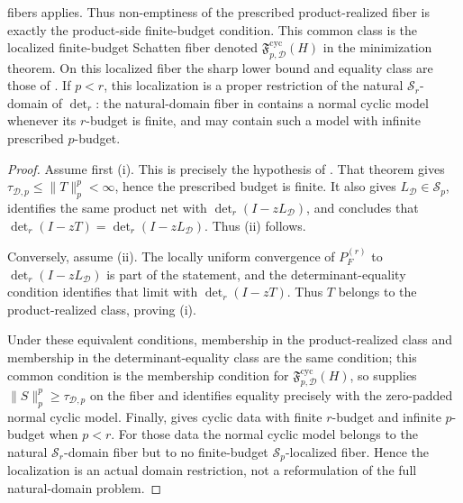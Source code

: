 \begin{proposition}
  fibers applies.  Thus non-emptiness of the prescribed product-realized fiber
  is exactly the product-side finite-budget condition.
  This common class is the localized finite-budget Schatten fiber denoted
  \(\mathfrak F_{p,\mathcal D}^{\mathrm{cyc}}(H)\) in the minimization theorem.
  On this localized fiber the sharp lower bound and equality class are those of
  .  If \(p<r\), this
  localization is a proper restriction of the natural \(\mathcal S_r\)-domain
  of \(\det_r\): the natural-domain fiber in
   contains a normal cyclic
  model whenever its \(r\)-budget is finite, and may contain such a model with
  infinite prescribed \(p\)-budget.
\end{proposition}

\begin{proof}
  Assume first \textup{(i)}.  This is precisely the hypothesis of
  .  That theorem gives
  \(\tau_{\mathcal D,p}\le\|T\|_p^p<\infty\), hence the prescribed budget is
  finite.  It also gives \(L_{\mathcal D}\in\mathcal S_p\), identifies the same
  product net with \(\det_r(I-zL_{\mathcal D})\), and concludes that
  \(\det_r(I-zT)=\det_r(I-zL_{\mathcal D})\).  Thus \textup{(ii)} follows.

  Conversely, assume \textup{(ii)}.  The locally uniform convergence of
  \(P_F^{(r)}\) to \(\det_r(I-zL_{\mathcal D})\) is part of the statement, and
  the determinant-equality condition identifies that limit with
  \(\det_r(I-zT)\).  Thus \(T\) belongs to the product-realized class, proving
  \textup{(i)}.

  Under these equivalent conditions, membership in the product-realized class
  and membership in the determinant-equality class are the same condition; this
  common condition is the membership condition for
  \(\mathfrak F_{p,\mathcal D}^{\mathrm{cyc}}(H)\), so
   supplies
  \(\|S\|_p^p\ge\tau_{\mathcal D,p}\) on the fiber and identifies equality
  precisely with the zero-padded normal cyclic model.  Finally,
   gives cyclic data with
  finite \(r\)-budget and infinite \(p\)-budget when \(p<r\).  For those data
  the normal cyclic model belongs to the natural \(\mathcal S_r\)-domain fiber
  but to no finite-budget \(\mathcal S_p\)-localized fiber.  Hence the
  localization is an actual domain restriction, not a reformulation of the full
  natural-domain problem.
\end{proof}

